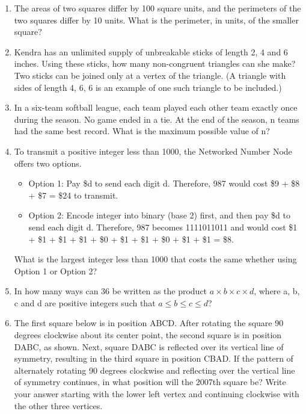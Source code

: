 \documentclass[12pt]{article}
\begin{document}
\begin{enumerate}
\item The areas of two squares differ by 100 square units, and the
perimeters of the two squares differ by 10 units. What is the
perimeter, in units, of the smaller square?

\vspace{1cm}

\item  Kendra has an unlimited supply of unbreakable sticks of
length 2, 4 and 6 inches. Using these sticks, how many non-congruent
triangles can she make? Two sticks can be joined only at a vertex of
the triangle. (A triangle with sides of length 4, 6, 6 is an example
of one such triangle to be included.)
\vspace{1cm}
\vspace{1cm}

\item In a six-team softball league, each team played each other team
exactly once during the season. No game ended in a tie. At the end of the season,
n teams had the same best record. What is the maximum possible value of n?

\item To transmit a positive integer less than 1000, the Networked Number Node
offers two options.
\begin{itemize}
\item Option 1:   Pay \$d to send each digit d.
Therefore, 987 would  cost \$9 + \$8 + \$7 = \$24 to transmit.
\item Option 2:  Encode integer into binary (base 2) first, and then
pay \$d to send each digit d.  Therefore, 987 becomes 1111011011 and would
cost \$1 + \$1 + \$1 + \$1 + \$0 + \$1 + \$1 + \$0 + \$1 + \$1 = \$8.
\end{itemize}
What is the largest integer less than 1000 that costs the same whether
using Option 1 or Option 2?
\vspace{1cm}
\item In how many ways can 36 be written as the product
$a \times b \times c \times d$, where a, b, c and d are positive integers such
that $a \le b \le c \le d$?
\vspace{1cm}
\item The first square below is in position ABCD. After rotating the
square 90 degrees clockwise about its center point, the second
square is in position DABC, as shown. Next, square DABC
is reflected over its vertical line of symmetry, resulting in the
third square in position CBAD. If the pattern of alternately
rotating 90 degrees clockwise and reflecting over the vertical
line of symmetry continues, in what position will the 2007th
square be? Write your answer starting with the lower left
vertex and continuing clockwise with the other three vertices.
\vspace{1cm}


\end{enumerate}
\end{document}
